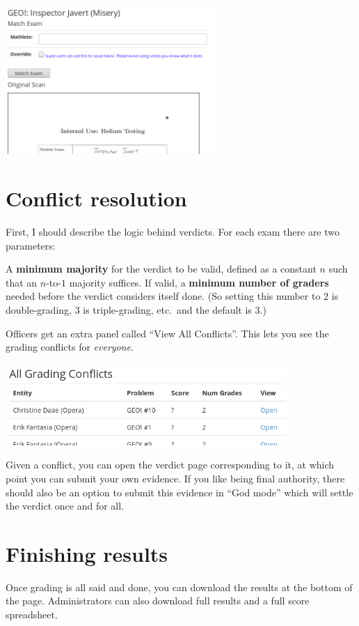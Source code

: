 \begin{center}
	\includegraphics[width=0.6\textwidth]{images/viewpaper1.png}
\end{center}

\section{Conflict resolution}
First, I should describe the logic behind verdicts.
For each exam there are two parameters:
\begin{itemize}
	\ii A \textbf{minimum majority} for the verdict to be valid,
	defined as a constant $n$ such that an $n$-to-$1$ majority suffices.
	\ii If valid, a \textbf{minimum number of graders} needed before
	the verdict considers itself done.
	(So setting this number to $2$ is double-grading,
	$3$ is triple-grading, etc.\ and the default is $3$.)
\end{itemize}

Officers get an extra panel called ``View All Conflicts''.
This lets you see the grading conflicts for \emph{everyone}.

\begin{center}
	\includegraphics[width=0.8\textwidth]{images/all-conflict.png}
\end{center}

Given a conflict, you can open the verdict page corresponding to it,
at which point you can submit your own evidence.
If you like being final authority,
there should also be an option to submit this evidence in ``God mode''
which will settle the verdict once and for all.
\section{Finishing results}
Once grading is all said and done,
you can download the results at the bottom of the page.
Administrators can also download full results
and a full score spreadsheet.


